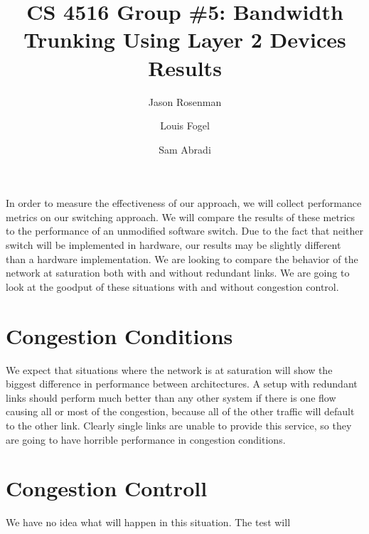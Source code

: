 \documentclass{article}
\title{CS 4516 Group \#5: Bandwidth Trunking Using Layer 2 Devices\\Results}
\author{Jason Rosenman \and Louis Fogel \and Sam Abradi}
\date{}
\begin{document}
\maketitle
In order to measure the effectiveness of our approach, we will collect performance metrics on our switching approach.
We will compare the results of these metrics to the performance of an unmodified software switch.
Due to the fact that neither switch will be implemented in hardware, our results may be slightly different than a hardware implementation.
We are looking to compare the behavior of the network at saturation both with and without redundant links.
We are going to look at the goodput of these situations with and without congestion control.
\section{Congestion Conditions}
We expect that situations where the network is at saturation will show the biggest difference in performance between architectures. A setup with redundant links should perform much better than any other system if there is one flow causing all or most of the congestion, because all of the other traffic will default to the other link. Clearly single links are unable to provide this service, so they are going to have horrible performance in congestion conditions.
\section{Congestion Controll}
We have no idea what will happen in this situation. The test will 
\end{document}
